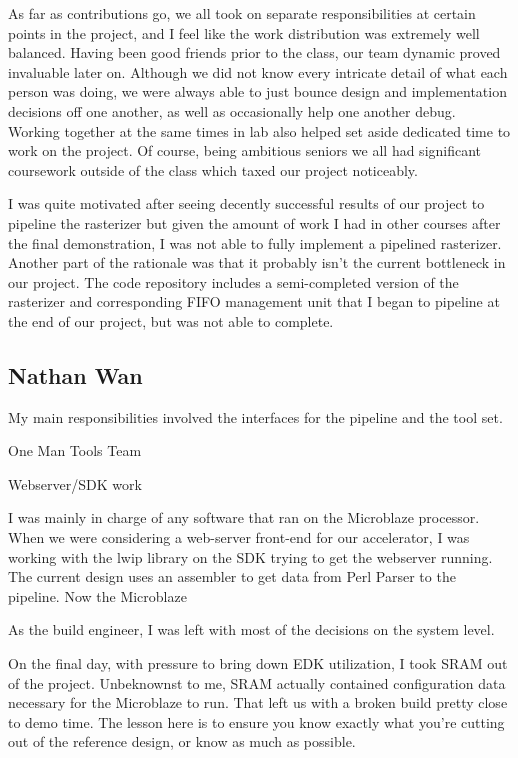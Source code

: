 \documentclass[letterpaper,10pt]{article}
\begin{document}
As far as contributions go, we all took on separate responsibilities at certain points in the project, and I feel like the work distribution was extremely well balanced. Having been good friends prior to the class, our team dynamic proved invaluable later on. Although we did not know every intricate detail of what each person was doing, we were always able to just bounce design and implementation decisions off one another, as well as occasionally help one another debug. Working together at the same times in lab also helped set aside dedicated time to work on the project. Of course, being ambitious seniors we all had significant coursework outside of the class which taxed our project noticeably.

I was quite motivated after seeing decently successful results of our project to pipeline the rasterizer but given the amount of work I had in other courses after the final demonstration, I was not able to fully implement a pipelined rasterizer. Another part of the rationale was that it probably isn't the current bottleneck in our project. The code repository includes a semi-completed version of the rasterizer and corresponding FIFO management unit that I began to pipeline at the end of our project, but was not able to complete.

\subsection{Nathan Wan}

My main responsibilities involved the interfaces for the pipeline and the tool set.

One Man Tools Team

Webserver/SDK work

I was mainly in charge of any software that ran on the Microblaze processor.  When we were considering a web-server front-end for our accelerator, I was working with the lwip library on the SDK trying to get the webserver running.  The current design uses an assembler to get data from Perl Parser to the pipeline.  Now the Microblaze 

As the build engineer, I was left with most of the decisions on the system level.   

On the final day, with pressure to bring down EDK utilization, I took SRAM out of the project.  Unbeknownst to me, SRAM actually contained configuration data necessary for the Microblaze to run.  That left us with a broken build pretty close to demo time.   The lesson here is to ensure you know exactly what you're cutting out of the reference design, or know as much as possible.
\end{document}
